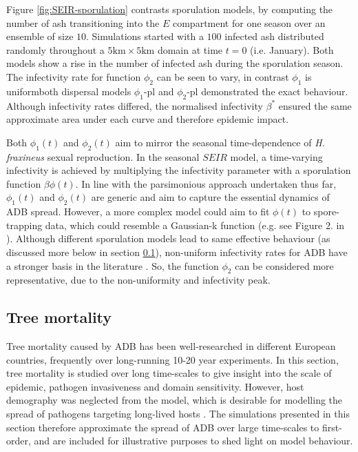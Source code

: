 Figure \ref{fig:SEIR-sporulation} contrasts sporulation models, by computing the number of ash transitioning into the $E$ compartment for one season over an ensemble of size $10$.
Simulations started with a $100$ infected ash distributed randomly throughout a $\mathrm{5km \times 5km}$ domain at time $t=0$ (i.e. January).
Both models show a rise in the number of infected ash during the sporulation season.
The infectivity rate for function $\phi_2$ can be seen to vary, in contrast $\phi_1$ is uniform\textemdash both dispersal models $\phi_1$-pl and $\phi_2$-pl demonstrated the exact behaviour.
Although infectivity rates differed, the normalised infectivity $\beta^*$ ensured the same approximate area under each curve and therefore epidemic impact.

Both $\phi_1(t)$ and $\phi_2(t)$ aim to mirror the seasonal time-dependence of \textit{H. fraxineus} sexual reproduction.
In the seasonal $SEIR$ model, a time-varying infectivity is achieved by multiplying the infectivity parameter with a sporulation function $\beta\phi(t)$.
In line with the parsimonious approach undertaken thus far, $\phi_1(t)$ and $\phi_2(t)$ are generic and aim to capture the essential dynamics of ADB spread.
However, a more complex model could aim to fit $\phi(t)$ to spore-trapping data, which could resemble a Gaussian-k function (e.g. see Figure 2. in \cite{grosdidier2018tracking}).
Although different sporulation models lead to same effective behaviour (as discussed more below in section \ref{sec:tree-mortality}), 
non-uniform infectivity rates for ADB have a stronger basis in the literature \cite{grosdidier2018tracking, time-varying-infectivity, hietala2013invasive, segarra2001epidemic}.
So, the function $\phi_2$ can be considered more representative, due to the non-uniformity and infectivity peak.

\subsection{Tree mortality}
\label{sec:tree-mortality}

Tree mortality caused by ADB has been well-researched in different European countries, frequently over long-running 10-20 year experiments.
In this section, tree mortality is studied over long time-scales to give insight into the scale of epidemic, pathogen invasiveness and domain sensitivity.
However, host demography was neglected from the model, which is desirable for modelling the spread of pathogens targeting long-lived hosts \cite{doi:10.1098/rstb.1996.0059}.
The simulations presented in this section therefore approximate the spread of ADB over large time-scales to first-order, 
and are included for illustrative purposes to shed light on model behaviour.

